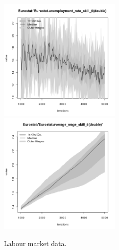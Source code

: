 \begin{figure}[H!]
\begin{minipage}{14cm}
\includegraphics[width=6cm]{./png/tax_0.10/Eurostat-unemployment_rate_skill_5.png}
\includegraphics[width=6cm]{./png/tax_0.10/Eurostat-average_wage_skill_5.png}
\end{minipage}
\caption{Labour market data.}
\label{Figure: Labour Market}
\end{figure}


